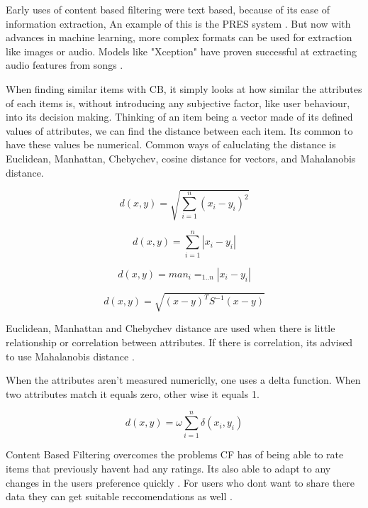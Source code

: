 Early uses of content based filtering were text based, because of its ease of information extraction, An example of this is the PRES system \citep{van_meteren_using_2000}. But now with advances in machine learning, more complex formats can be used for extraction like images or audio. Models like "Xception" have proven successful at extracting audio features from songs \citep{chollet_xception_2017} \citep{singh_robustness_2022}.

When finding similar items with CB, it simply looks at how similar the attributes of each items is, without introducing any subjective factor, like user behaviour, into its decision making. Thinking of an item being a vector made of its defined values of attributes, we can find the distance between each item. Its common to have these values be numerical. Common ways of caluclating the distance is Euclidean, Manhattan, Chebychev, cosine distance for vectors, and Mahalanobis distance.

\begin{equation}
	d(x,y) = \sqrt{\sum _{i=1} ^{n}(x_{i} - y_{i})^{2}}
\end{equation}

\begin{equation}
	d(x,y) = \sum _{i=1} ^{n} | x_{i} - y_{i} |
\end{equation}

\begin{equation}
	d(x,y) = man_{i} = _{1 . . n} | x_{i} - y_{i} |
\end{equation}

\begin{equation}
	d(x,y) = \sqrt{ ( x - y )^{ T } S^{ -1 } ( x - y ) }
\end{equation}

Euclidean, Manhattan and Chebychev distance are used when there is little relationship or correlation between attributes. If there is correlation, its advised to use Mahalanobis distance \citep{celma_recommendation_2010}.

When the attributes aren't measured numericlly, one uses a delta function. When two attributes match it equals zero, other wise it equals 1.

\begin{equation}
	d(x,y) = \omega \sum _{ i = 1 } ^{ n } \delta (x _{i}, y _{i})
\end{equation}

Content Based Filtering overcomes the problems CF has of being able to rate items that previously havent had any ratings. Its also able to adapt to any changes in the users preference quickly \citep{isinkaye_recommendation_2015}. For users who dont want to share there data they can get suitable reccomendations as well \citep{k_you_2006}.

